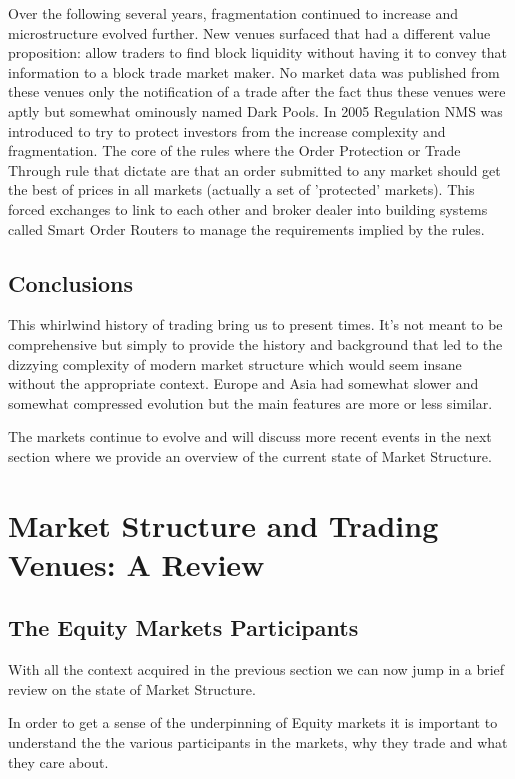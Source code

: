 Over the following several years, fragmentation continued to increase and microstructure evolved further. New venues surfaced that had a different value proposition:  allow traders to find block liquidity without having it to convey that information to a block trade market maker. No market data was  published from these venues only the notification of a trade after the fact thus these venues were aptly but somewhat ominously named Dark Pools. In 2005 Regulation NMS was introduced to try to protect investors from the increase complexity and fragmentation. The core of the rules where the Order Protection or Trade Through rule that dictate are that an order submitted to any market should get the best of prices in all markets (actually a set of 'protected' markets). This forced exchanges to link to each other and broker dealer into building systems called Smart Order Routers to manage the requirements implied by the rules.


\subsection{Conclusions}


This whirlwind history of trading bring us to present times. It's not meant to be comprehensive but simply to provide the history and background that led to the dizzying complexity of modern market structure which would seem insane without the appropriate context. Europe and Asia had somewhat slower and somewhat compressed evolution but the main features are more or less similar.

The markets continue to evolve and will discuss more recent events in the next section where we provide an overview of the current state of Market Structure.


\section{Market Structure and Trading Venues: A Review}

\subsection{The Equity Markets Participants}
With all the context acquired in the previous section we can now jump in a brief review on the state of Market Structure. 

In order to get a sense of the underpinning of Equity markets  it is important to understand the the various participants in the markets, why they trade and what they care about.

